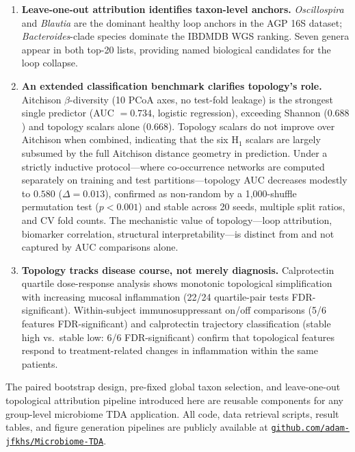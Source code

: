 \begin{enumerate}[leftmargin=*, itemsep=3pt]
  \item \textbf{Leave-one-out attribution identifies taxon-level anchors.}
  \textit{Oscillospira} and \textit{Blautia} are the dominant healthy loop
  anchors in the AGP 16S dataset; \textit{Bacteroides}-clade species
  dominate the IBDMDB WGS ranking.
  Seven genera appear in both top-20 lists, providing named biological
  candidates for the loop collapse.

  \item \textbf{An extended classification benchmark clarifies topology's role.}
  Aitchison $\beta$-diversity (10 PCoA axes, no test-fold leakage) is the
  strongest single predictor (AUC $= 0.734$, logistic regression), exceeding
  Shannon ($0.688$) and topology scalars alone ($0.668$).
  Topology scalars do not improve over Aitchison when combined, indicating that
  the six H$_1$ scalars are largely subsumed by the full Aitchison distance
  geometry in prediction.
  Under a strictly inductive protocol---where co-occurrence networks are
  computed separately on training and test partitions---topology AUC decreases
  modestly to $0.580$ ($\Delta = 0.013$), confirmed as non-random by a
  1{,}000-shuffle permutation test ($p < 0.001$) and stable across 20 seeds,
  multiple split ratios, and CV fold counts.
  The mechanistic value of topology---loop attribution, biomarker correlation,
  structural interpretability---is distinct from and not captured by AUC
  comparisons alone.

  \item \textbf{Topology tracks disease course, not merely diagnosis.}
  Calprotectin quartile dose-response analysis shows monotonic topological
  simplification with increasing mucosal inflammation (22/24 quartile-pair
  tests FDR-significant).
  Within-subject immunosuppressant on/off comparisons (5/6 features
  FDR-significant) and calprotectin trajectory classification (stable high
  vs.\ stable low: 6/6 FDR-significant) confirm that topological features
  respond to treatment-related changes in inflammation within the same
  patients.

\end{enumerate}

The paired bootstrap design, pre-fixed global taxon selection, and
leave-one-out topological attribution pipeline introduced here are reusable
components for any group-level microbiome TDA application.
All code, data retrieval scripts, result tables, and figure generation
pipelines are publicly available at
\href{https://github.com/adam-jfkhs/Microbiome-TDA}%
{\texttt{github.com/adam-jfkhs/Microbiome-TDA}}.

